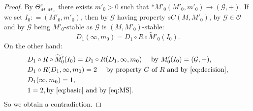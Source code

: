 \documentclass{amsart}  %
\numberwithin{equation}{section}
\theoremstyle{definition}
\theoremstyle{remark}
\begin{document}
{\begin{proof}
By $\Theta ^{s}  _{M,M' _{0} } $ there exists $m' _{0} >0 $ such that $*M' _{0}   (M' _{0}, m' _{0}  ) \to (\mathcal{G},+)$. If we set $I _{0}: = ({M}' _{0}, m' _{0})$, then by  $\mathcal{G}$ having property $sC (M,M' _{0} )$, by $\mathcal{G} \in \mathcal{O}$ and by $\mathcal{G}$ being $M' _{0} $-stable as $\mathcal{G}$ is $(M,M' _{0} )$-stable:
\begin {equation} \label{eq:basic}
   D_1 (\infty, m _{0}) = D_1 \circ R \circ  \widetilde{M}' _{0} (I _{0} ).
\end{equation}
On the other hand:
\begin{align} 
      &  D_1 \circ R \circ  \widetilde{M}' _{0}   (I _{0} ) = D_1 \circ R (D_1, \infty, m _{0} )   \quad \text{ by $M' _{0}  (I _{0} ) = (\mathcal{G},+)$}, \\
 &  D_1 \circ R (D_1, \infty, m _{0} )=2 \quad \text{ by property $G$ of $R$ and by \eqref{eq:decision}}, \label{eq:MS} \\
& D_1 (\infty, m _{0} ) =1, \\ 
& 1=2, \text{by \eqref{eq:basic} and by \eqref{eq:MS}.
   }
\end{align}
 So we obtain a contradiction.
%
%
%


\end{proof}}
\end{document}
